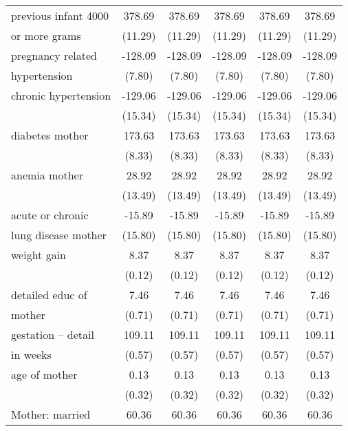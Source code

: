 \begin{table}[htbp]
\begin{tabular}{l*{5}{c}}
previous infant 4000&      378.69&      378.69&      378.69&      378.69&      378.69\\
or more grams       &     (11.29)&     (11.29)&     (11.29)&     (11.29)&     (11.29)\\
pregnancy related   &     -128.09&     -128.09&     -128.09&     -128.09&     -128.09\\
hypertension        &      (7.80)&      (7.80)&      (7.80)&      (7.80)&      (7.80)\\
chronic hypertension&     -129.06&     -129.06&     -129.06&     -129.06&     -129.06\\
                    &     (15.34)&     (15.34)&     (15.34)&     (15.34)&     (15.34)\\
diabetes mother     &      173.63&      173.63&      173.63&      173.63&      173.63\\
                    &      (8.33)&      (8.33)&      (8.33)&      (8.33)&      (8.33)\\
anemia mother       &       28.92&       28.92&       28.92&       28.92&       28.92\\
                    &     (13.49)&     (13.49)&     (13.49)&     (13.49)&     (13.49)\\
acute or chronic    &      -15.89&      -15.89&      -15.89&      -15.89&      -15.89\\
lung disease mother &     (15.80)&     (15.80)&     (15.80)&     (15.80)&     (15.80)\\
weight gain         &        8.37&        8.37&        8.37&        8.37&        8.37\\
                    &      (0.12)&      (0.12)&      (0.12)&      (0.12)&      (0.12)\\
detailed educ of    &        7.46&        7.46&        7.46&        7.46&        7.46\\
mother              &      (0.71)&      (0.71)&      (0.71)&      (0.71)&      (0.71)\\
gestation -- detail &      109.11&      109.11&      109.11&      109.11&      109.11\\
in weeks            &      (0.57)&      (0.57)&      (0.57)&      (0.57)&      (0.57)\\
age of mother       &        0.13&        0.13&        0.13&        0.13&        0.13\\
                    &      (0.32)&      (0.32)&      (0.32)&      (0.32)&      (0.32)\\
Mother: married     &       60.36&       60.36&       60.36&       60.36&       60.36\\

\end{tabular}
\end{table}
